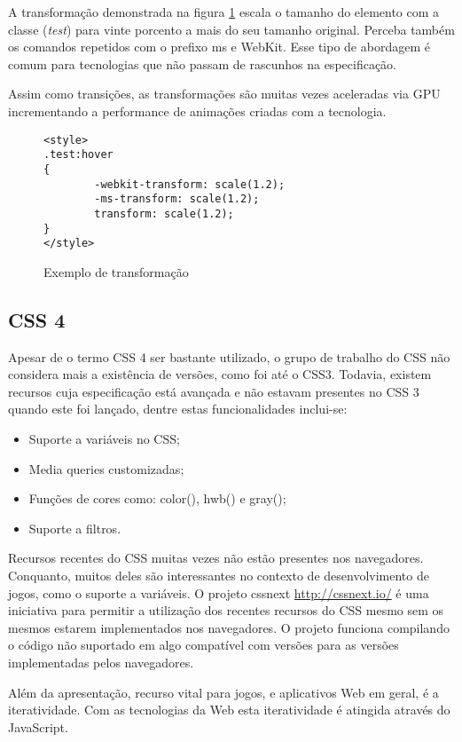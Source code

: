 A transformação demonstrada na figura \ref{fig:CSSTransform} escala o
tamanho do elemento com a classe (\textit{test}) para vinte porcento a
mais do seu tamanho original. Perceba também os comandos repetidos com
o prefixo ms e WebKit. Esse tipo de abordagem é comum para tecnologias
que não passam de rascunhos na especificação.

Assim como transições, as transformações são muitas vezes aceleradas
via GPU incrementando a performance de animações criadas com a tecnologia.

\begin{figure}[H]
\centering
\begin{verbatim}
<style>
.test:hover
{
        -webkit-transform: scale(1.2);
        -ms-transform: scale(1.2);
        transform: scale(1.2);
}
</style>
\end{verbatim}
\caption{Exemplo de transformação}
\label{fig:CSSTransform}
\end{figure}

\subsection{CSS 4}

Apesar de o termo CSS 4 ser bastante utilizado, o grupo de trabalho do CSS
não considera mais a existência de versões, como foi até o CSS3.
Todavia, existem recursos cuja especificação está avançada e não estavam presentes
no CSS 3 quando este foi lançado, dentre estas funcionalidades inclui-se:

\begin{itemize}
\item Suporte a variáveis no CSS;
\item Media queries customizadas;
\item Funções de cores como: color(), hwb() e gray();
\item Suporte a filtros.
\end{itemize}

Recursos recentes do CSS muitas vezes não estão presentes nos
navegadores. Conquanto, muitos deles são interessantes no contexto de
desenvolvimento de jogos, como o suporte a variáveis. O projeto cssnext
\url{http://cssnext.io/} é uma iniciativa para permitir a utilização
dos recentes recursos do CSS mesmo sem os mesmos estarem implementados
nos navegadores. O projeto funciona compilando o código não suportado
em algo compatível com versões para as versões implementadas pelos
navegadores.

Além da apresentação, recurso vital para jogos, e aplicativos Web em
geral, é a iteratividade. Com as tecnologias da Web esta iteratividade
é atingida através do JavaScript.
